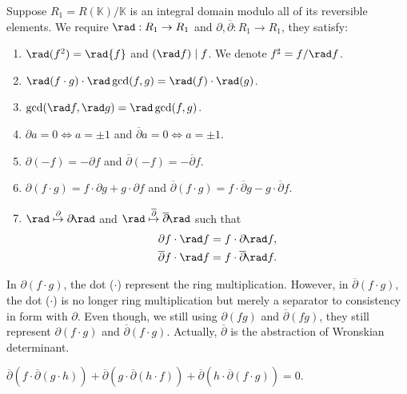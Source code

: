 \begin{definition}\label{def:der-rad-rings}
	Suppose $R_1 = R(\mathbb{K})/\mathbb{K}$ is an integral domain modulo all of its reversible elements. We require $\rad: R_1 \to R_1$ and $\partial, \overline{\partial}: R_1 \to R_1$, they satisfy:
	\begin{enumerate}
		\item $\rad(f^{2}) = \rad{f}$ and $(\rad f) \mid f$. We denote $f^{\sharp} = f/\rad f$.
		\item $\rad (f\cdot g)\cdot\rad\gcd(f, g) = \rad(f)\cdot\rad(g)$.
		\item $\gcd(\rad f, \rad g) = \rad\gcd(f, g)$.
		\item $\partial a = 0 \Longleftrightarrow a = \pm 1$ and $\overline{\partial} a = 0 \Longleftrightarrow a = \pm 1$.
		\item $\partial (-f) = -\partial f$ and $\overline{\partial} (-f) = -\overline{\partial} f$.
		\item $\partial(f\cdot g) = f\cdot\partial{g} + g\cdot\partial{f}$ and $\overline{\partial}(f \cdot g) = f\cdot\overline{\partial}{g} - g\cdot\overline{\partial}{f}$.
		\item $\rad \overset{\partial}{\mapsto} \partial\!\rad$ and $\rad \overset{\overline{\partial}}{\mapsto} \overline{\partial}\!\rad$ such that
		\begin{align*}
			\partial f \cdot \rad f &= f \cdot \partial\!\rad f, \\
			\overline{\partial} f \cdot \rad f &= f \cdot \overline{\partial}\!\rad f.
		\end{align*}
	\end{enumerate}
\end{definition}
\begin{remark}
	In $\partial(f\cdot g)$, the dot ($\cdot$) represent the ring multiplication. However, in $\overline{\partial}(f\cdot g)$, the dot ($\cdot$) is no longer ring multiplication but merely a separator to consistency in form with $\partial$. Even though, we still using $\partial(fg)$ and $\overline{\partial}(fg)$, they still represent $\partial(f\cdot g)$ and $\overline{\partial}(f\cdot g)$. Actually, $\overline{\partial}$ is the abstraction of Wronskian determinant.
\end{remark}
\begin{proposition}
	$\overline{\partial}(f\cdot\overline{\partial}(g\cdot h)) + \overline{\partial}(g\cdot\overline{\partial}(h\cdot f)) + \overline{\partial}(h\cdot\overline{\partial}(f\cdot g)) = 0$.
\end{proposition}
